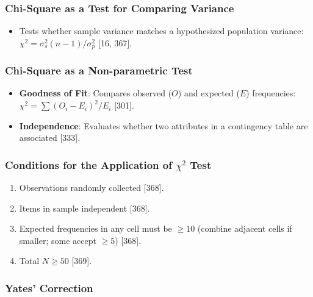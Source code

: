 \documentclass[
]{article}
\providecommand{\tightlist}{%
  \setlength{\itemsep}{0pt}\setlength{\parskip}{0pt}}
\begin{document}
\subsubsection{Chi-Square as a Test for Comparing
Variance}\label{chi-square-as-a-test-for-comparing-variance}

\begin{itemize}
\tightlist
\item
  Tests whether sample variance matches a hypothesized population
  variance: \(\chi^2 = \sigma_s^2 (n - 1) / \sigma_p^2\) {[}16, 367{]}.
\end{itemize}

\subsubsection{Chi-Square as a Non-parametric
Test}\label{chi-square-as-a-non-parametric-test}

\begin{itemize}
\tightlist
\item
  \textbf{Goodness of Fit}: Compares observed (\(O\)) and expected
  (\(E\)) frequencies: \(\chi^2 = \sum (O_i - E_i)^2 / E_i\) {[}301{]}.
\item
  \textbf{Independence}: Evaluates whether two attributes in a
  contingency table are associated {[}333{]}.
\end{itemize}

\subsubsection{\texorpdfstring{Conditions for the Application of
\(\chi^2\)
Test}{Conditions for the Application of \textbackslash chi\^{}2 Test}}\label{conditions-for-the-application-of-chi2-test}

\begin{enumerate}
\def\labelenumi{\arabic{enumi}.}
\tightlist
\item
  Observations randomly collected {[}368{]}.
\item
  Items in sample independent {[}368{]}.
\item
  Expected frequencies in any cell must be \(\ge 10\) (combine adjacent
  cells if smaller; some accept \(\ge 5\)) {[}368{]}.
\item
  Total \(N \ge 50\) {[}369{]}.
\end{enumerate}

\subsubsection{Yates' Correction}\label{yates-correction}
\end{document}
